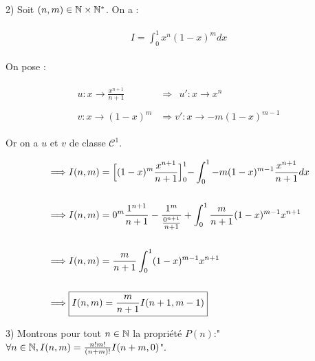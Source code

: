 \documentclass{article}
\begin{document}
\bigskip
\bigskip
\bigskip

2) Soit $(n, m)\in\mathbb{N}\times\mathbb{N}^*$. On a :

\begin{align}
\begin{split}
I=\int_0^1x^n(1-x)^mdx
\end{split}
\end{align}

On pose :

\begin{align}
\begin{split}
u:x\rightarrow \frac{x^{n+1}}{n+1} ~~~ &\Longrightarrow ~~ u':x\rightarrow x^n\\\\
v:x\rightarrow(1-x)^m &\Longrightarrow v':x\rightarrow-m(1-x)^{m-1}
\end{split}
\end{align}

Or on a $u$ et $v$ de classe $\mathcal{C}^1$.

\begin{align}
\begin{split}
&\Longrightarrow I(n, m) = \Bigl[(1-x)^m\frac{x^{n+1}}{n+1}\Bigl]_0^1 - \int_0^1 -m(1-x)^{m-1}\frac{x^{n+1}}{n+1}dx\\\\
&\Longrightarrow I(n, m) = 0^m\frac{1^{n+1}}{n+1} - \frac{1^m}{\frac{0^{n+1}}{n+1}} + \int_0^1\frac{m}{n+1}(1-x)^{m-1}x^{n+1}\\\\
&\Longrightarrow I(n, m) = \frac{m}{n+1}\int_0^1(1-x)^{m-1}x^{n+1}\\\\
&\Longrightarrow \boxed{I(n, m) =\frac{m}{n+1}I(n+1, m-1)}
\end{split}
\end{align}

\newpage

3) Montrons pour tout $n\in\mathbb{N}$ la propriété $P(n)$:"$\forall n\in\mathbb{N}, I(n, m)=\frac{n!m!}{(n+m)!}I(n+m, 0)$".
\end{document}
